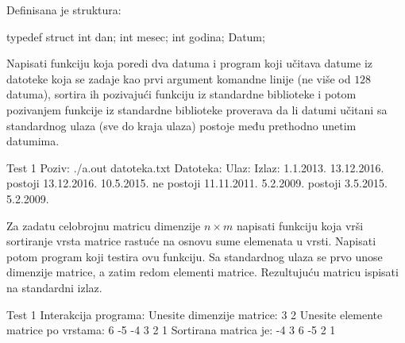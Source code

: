 \begin{Answer}[ref=524]
\end{Answer}
\begin{Exercise}[label=525]
  Definisana je struktura:
  \begin{ckod}
    typedef struct { int dan; int mesec; int godina; } Datum;
  \end{ckod}
  Napisati funkciju koja poredi dva datuma i program koji učitava
  datume iz datoteke koja se zadaje kao prvi argument komandne linije
  (ne više od $128$ datuma), sortira ih pozivajući funkciju
   iz standardne biblioteke i potom pozivanjem funkcije
   iz standardne biblioteke proverava da li datumi
  učitani sa standardnog ulaza (sve do kraja ulaza) postoje među
  prethodno unetim datumima.
  
\begin{maxitest}
\begin{test}{Test 1}
Poziv: ./a.out datoteka.txt
Datoteka:             Ulaz:              Izlaz:
1.1.2013.             13.12.2016.        postoji
13.12.2016.           10.5.2015.         ne postoji
11.11.2011.           5.2.2009.          postoji
3.5.2015.
5.2.2009.
\end{test}
\end{maxitest}
  
\end{Exercise}

\begin{Exercise}[label=526]
  Za zadatu celobrojnu matricu dimenzije $n \times m$ napisati
  funkciju koja vrši sortiranje vrsta matrice rastuće na osnovu sume
  elemenata u vrsti. Napisati potom program koji testira ovu funkciju. Sa
  standardnog ulaza se prvo unose dimenzije matrice, a zatim redom
  elementi matrice. Rezultujuću matricu ispisati na standardni izlaz.

\begin{maxitest}
\begin{test}{Test 1}
Interakcija programa:    
  Unesite dimenzije matrice: 3 2
  Unesite elemente matrice po vrstama:
  6 -5
  -4 3
  2 1
  Sortirana matrica je:
  -4 3 
  6 -5 
  2 1   
\end{test}
\end{maxitest}

\end{Exercise}

